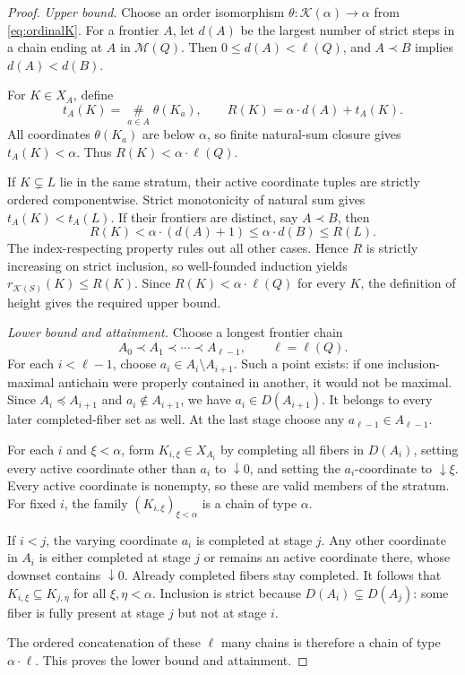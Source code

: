 \documentclass[11pt,a4paper]{article}
\theoremstyle{definition}
\theoremstyle{remark}
\newcommand{\K}{\mathcal K}
\newcommand{\M}{\mathcal M}
\newcommand{\bigns}{\mathop{\#}\limits}
\begin{document}
\begin{proof}
\emph{Upper bound.} Choose an order isomorphism
$\theta:\K(\alpha)\to\alpha$ from \eqref{eq:ordinalK}. For a frontier $A$,
let $d(A)$ be the largest number of strict steps in a chain ending at $A$
in $\M(Q)$. Then $0\le d(A)<\ell(Q)$, and $A\prec B$ implies
$d(A)<d(B)$.

For $K\in X_A$, define
\[
 t_A(K)=\bigns_{a\in A}\theta(K_a),
 \qquad
 R(K)=\alpha\cdot d(A)+t_A(K).
\]
All coordinates $\theta(K_a)$ are below $\alpha$, so finite natural-sum
closure gives $t_A(K)<\alpha$. Thus $R(K)<\alpha\cdot\ell(Q)$.

If $K\subsetneq L$ lie in the same stratum, their active coordinate tuples
are strictly ordered componentwise. Strict monotonicity of natural sum
gives $t_A(K)<t_A(L)$. If their frontiers are distinct, say $A\prec B$,
then
\[
 R(K)<\alpha\cdot(d(A)+1)
       \le\alpha\cdot d(B)\le R(L).
\]
The index-respecting property rules out all other cases. Hence $R$ is
strictly increasing on strict inclusion, so well-founded induction yields
$r_{\K(S)}(K)\le R(K)$. Since $R(K)<\alpha\cdot\ell(Q)$ for every $K$,
the definition of height gives the required upper bound.

\emph{Lower bound and attainment.} Choose a longest frontier chain
\[
 A_0\prec A_1\prec\cdots\prec A_{\ell-1},
 \qquad \ell=\ell(Q).
\]
For each $i<\ell-1$, choose $a_i\in A_i\setminus A_{i+1}$. Such a point
exists: if one inclusion-maximal antichain were properly contained in
another, it would not be maximal. Since $A_i\preceq A_{i+1}$ and
$a_i\notin A_{i+1}$, we have $a_i\in D(A_{i+1})$. It belongs to every
later completed-fiber set as well. At the last stage choose any
$a_{\ell-1}\in A_{\ell-1}$.

For each $i$ and $\xi<\alpha$, form $K_{i,\xi}\in X_{A_i}$ by completing
all fibers in $D(A_i)$, setting every active coordinate other than $a_i$
to $\downarrow0$, and setting the $a_i$-coordinate to $\downarrow\xi$.
Every active coordinate is nonempty, so these are valid members of the
stratum. For fixed $i$, the family $(K_{i,\xi})_{\xi<\alpha}$ is a chain
of type $\alpha$.

If $i<j$, the varying coordinate $a_i$ is completed at stage $j$. Any
other coordinate in $A_i$ is either completed at stage $j$ or remains an
active coordinate there, whose downset contains $\downarrow0$. Already
completed fibers stay completed. It follows that
$K_{i,\xi}\subseteq K_{j,\eta}$ for all $\xi,\eta<\alpha$. Inclusion is
strict because $D(A_i)\subsetneq D(A_j)$: some fiber is fully present at
stage $j$ but not at stage $i$.

The ordered concatenation of these $\ell$ many chains is therefore a
chain of type $\alpha\cdot\ell$. This proves the lower bound and
attainment.
\end{proof}
\end{document}

